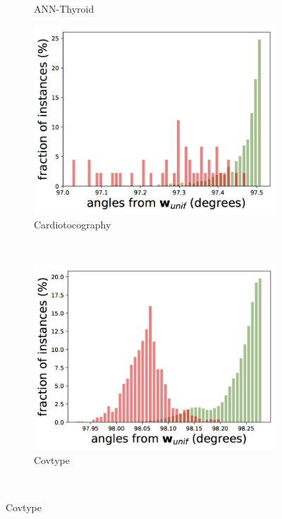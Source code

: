 \documentclass{article} %
\begin{document}
\begin{figure}[h]
\begin{subfigure}[b]{0.23\textwidth}
		\caption{ANN-Thyroid}
		\label{fig:angles_ann_thyroid_1v3}
	\end{subfigure}
	\begin{subfigure}[b]{0.23\textwidth}
		\includegraphics[width=\textwidth]{angles/angles_cardiotocography_1_iforest.png}%
		\caption{Cardiotocography}
		\label{fig:angles_cardiotocography}
	\end{subfigure}
	~
	\begin{subfigure}[b]{0.23\textwidth}
		\includegraphics[width=\textwidth]{angles/angles_covtype_iforest.png}
		\caption{Covtype}
		\label{fig:angles_covtype}
	\end{subfigure} \\

\end{figure}
\end{document}
